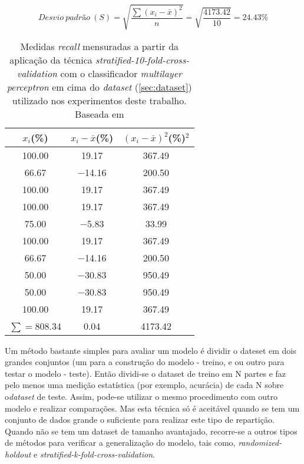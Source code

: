 \begin{equation} 
  Desvio~padrão~(S) = \sqrt{\frac{\sum{(x_{i}-\bar{x})^2}}{n}}=\sqrt{\frac{4173.42}{10}}=24.43\%
  \label{eq:standarddevapli}
\end{equation}

\begin{table}[!htp]
  \centering
  \begin{tabular}{|c c c|}
    \hline
       {\bf $x_{i}$(\%)} & {\bf $x_{i}-\bar{x}$(\%)} & {\bf $(x_{i}-\bar{x})^2$(\%)$^2$} \\
    \hline
       100.00 & 19.17 & 367.49\\
    \hline
       66.67 & −14.16 &  200.50\\
     \hline
       100.00 & 19.17 & 367.49\\
    \hline
       100.00 & 19.17 & 367.49\\
     \hline
       75.00 & −5.83 & 33.99\\
    \hline
       100.00 & 19.17 & 367.49\\
     \hline
       66.67 & −14.16 & 200.50\\
    \hline
       50.00 & −30.83 & 950.49\\
     \hline
       50.00 & −30.83 &  950.49\\
    \hline
       100.00 & 19.17 & 367.49\\
    \hline\hline
       $\sum=$808.34 & 0.04 &  4173.42\\
    \hline
  \end{tabular}
  \caption{Medidas \textit{recall} mensuradas a partir da aplicação da técnica \textit{stratified-10-fold-cross-validation} com o classificador \textit{multilayer perceptron} em cima do \textit{dataset} (\ref{sec:dataset}) utilizado nos experimentos deste trabalho. Baseada em \cite{Kerr:2002}}
  \label{table:datakcrossvalidation}
\end{table}
                    
Um método bastante simples para avaliar um modelo é dividir o dateset em dois grandes conjuntos (um para a construção do modelo - treino, e ou outro para testar o modelo - teste). Então dividi-se o dataset de treino em N partes e faz pelo menos uma medição estatística (por exemplo, acurácia) de cada N sobre o\textit{dataset} de teste. Assim, pode-se utilizar o mesmo procedimento com outro modelo e realizar comparações. Mas esta técnica só é aceitável quando se tem um conjunto de dados grande o suficiente para realizar este tipo de repartição.\cite{Kotsiantis:2007} Quando não se tem um dataset de tamanho avantajado, recorre-se a outros tipos de métodos para verificar a generalização do modelo, tais como, \textit{randomized-holdout} e \textit{stratified-k-fold-cross-validation}.\cite{Witten:2005}

